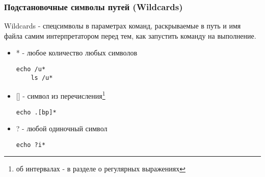 \begin{frame}[fragile]
  \frametitle{Подстановочные символы путей (Wildcards)}

  \alert{Wildcards} - спецсимволы в параметрах команд, раскрываемые в путь и имя файла самим интерпретатором перед тем, как запустить команду на выполнение. \pause


  \begin{itemize}
    \item \alert{*} - любое количество любых символов
\begin{lstlisting}[basicstyle=\normalsize]
	echo /u*
	ls /u*
\end{lstlisting} \pause
    \item \alert{[]} - символ из перечисления\footnote{об интервалах - в разделе о регулярных выражениях}
\begin{lstlisting}[basicstyle=\normalsize]
	echo .[bp]*
\end{lstlisting} \pause
    \item \alert{?} - любой одиночный символ
\begin{lstlisting}[basicstyle=\normalsize]
	echo ?i*
\end{lstlisting} 
  \end{itemize}

\end{frame}
